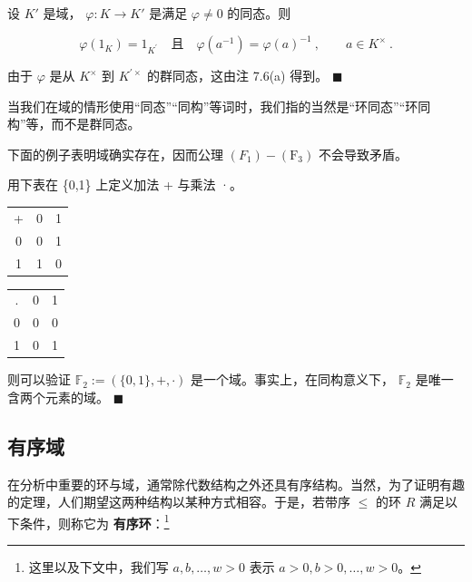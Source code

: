 \begin{remark}
\begin{items}
\item

设  $ K' $ 是域， $ \varphi: K \to K' $ 是满足  $ \varphi \neq 0 $ 的同态。则

\[
\varphi(1_{K})=1_{K^{\prime}}\quad\text{且}\quad\varphi(a^{-1})=\varphi(a)^{-1}~,\qquad a\in K^{\times}~.
\]

\proofhead
由于  $ \varphi $ 是从  $ K^{\times} $ 到  $ K^{\prime \times} $ 的群同态，这由注 7.6(a) 得到。 $ \blacksquare $
\end{items}

当我们在域的情形使用“同态”“同构”等词时，我们指的当然是“环同态”“环同构”等，而不是群同态。

下面的例子表明域确实存在，因而公理  $ (F_{1})-(\mathrm{F}_{3}) $ 不会导致矛盾。

\end{remark}

\begin{example}

用下表在 \{0,1\} 上定义加法 + 与乘法 ·。

\begin{center}
\begin{tabular}{ccc}
\toprule
+ & 0 & 1 \\
0 & 0 & 1 \\
1 & 1 & 0 \\
\bottomrule
\end{tabular}
\end{center}

\begin{center}
\begin{tabular}{ccc}
\toprule
. & 0 & 1 \\
0 & 0 & 0 \\
1 & 0 & 1 \\
\bottomrule
\end{tabular}
\end{center}

则可以验证  $ \mathbb{F}_2 := (\{0,1\}, +, \cdot) $ 是一个域。事实上，在同构意义下， $ \mathbb{F}_2 $ 是唯一含两个元素的域。 $ \blacksquare $

\end{example}

\subsection*{有序域}

在分析中重要的环与域，通常除代数结构之外还具有序结构。当然，为了证明有趣的定理，人们期望这两种结构以某种方式相容。于是，若带序  $ \leq $ 的环  $ R $ 满足以下条件，则称它为 \textbf{有序环}：\footnote{这里以及下文中，我们写 $a, b, \ldots, w > 0$ 表示 $a > 0, b > 0, \ldots, w > 0$。}

